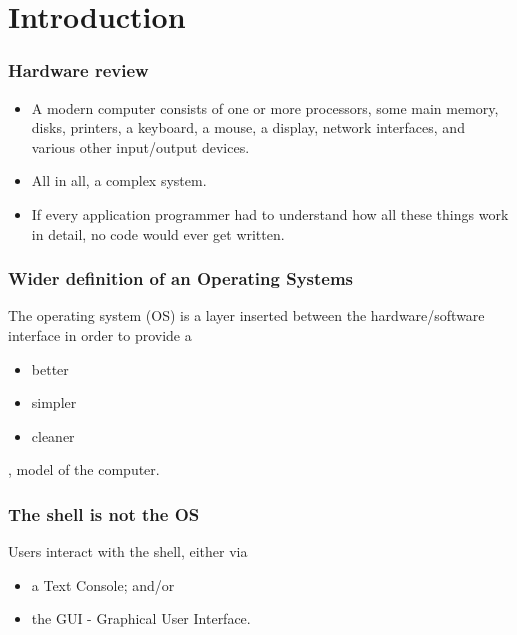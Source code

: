 \section{Introduction}

\begin{frame}
    \frametitle{Hardware review}
    
    \begin{itemize}
        \item 
        A modern  computer  consists  of  one  or  more
        processors, some main  memory, disks,  printers,  
        a  keyboard,  a  mouse, a  display,  
        network  interfaces,  and  various other 
        input/output devices.

        \item 
        All in all, a complex system.
        
        \item 
        If every application programmer had to understand
        how all these things work in detail,
        no code would ever get written.

    \end{itemize}    

\end{frame}

\begin{frame}
    \frametitle{Wider definition of an Operating Systems}
    
    The operating system (OS) is a layer inserted 
    between the hardware/software interface in order
    to provide a 
    \begin{itemize}
        \item better
        \item simpler
        \item cleaner
    \end{itemize}, 
    model of the computer.

\end{frame}

\begin{frame}
    \frametitle{The shell is not the OS}
    
    Users interact with the shell, either via 
    \begin{itemize}
        \item a Text Console; and/or
        \item the GUI - Graphical User Interface.
    \end{itemize}

\end{frame}
